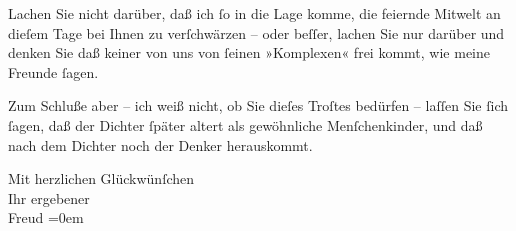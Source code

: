 \pstart
           Lachen Sie nicht darüber, daß ich{ }ſo in die Lage komme, die feiernde Mitwelt an
               dieſem Tage bei Ihnen zu verſchwärzen – oder beſſer, lachen Sie nur darüber und
               denken Sie daß keiner von uns von{ }ſeinen »Komplexen« frei kommt, wie meine Freunde{ }ſagen.\pend
           
\pstart
           Zum Schluße aber – ich weiß nicht, ob Sie dieſes Troſtes bedürfen – laſſen Sie{ }ſich{ }ſagen, daß der Dichter{ }ſpäter altert als gewöhnliche Menſchenkinder, und daß nach dem
               Dichter noch der Denker herauskommt.\pend
           
\pstart
           Mit herzlichen Glückwünſchen{\\[\baselineskip]} Ihr ergebener{\\[\baselineskip]}\spacefill\mbox{Freud}\pend
           \leftskip=0em{}\endnumbering{}
\begin{anhang}
\end{anhang}\newcommand{\dateiname}{L03886}\newcommand{\titel}{Sigmund Freud an Arthur Schnitzler, 14. 5. 1912}\newcommand{\editorInnen}{Selma Jahnke und Martin Anton Müller}
